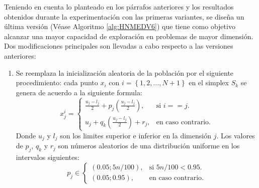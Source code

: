 Teniendo en cuenta lo planteado en los párrafos anteriores y los resultados obtenidos durante la experimentación con las primeras variantes, se diseña un última versión (Véase Algoritmo \ref{alg:HNMEDV6}) que tiene como objetivo alcanzar una mayor capacidad de exploración en problemas de mayor dimensión. Dos modificaciones principales son llevadas a cabo respecto a las versiones anteriores:
\begin{enumerate}
	\item Se reemplaza la inicialización aleatoria de la población por el siguiente procedimiento: cada punto $x_i$ con $i =\left\lbrace  1,2,...,N+1\right\rbrace $ en  el simplex $S_k$ se genera de acuerdo a la siguiente formula:
	\begin{equation}\label{eq:Inicializacion de Simpleces}
	x^i_j=\begin{cases}
	\frac{u_j-l_j}{2}+p_j(\frac{u_j-l_j}{2}), & \text{si $i==j$}.\\
	u_j+q_k(\frac{u_j-l_j}{2})+r_j, & \text{en caso contrario}.
	\end{cases}
	\end{equation}
	Donde $u_j$ y $l_j$ son los limites superior e inferior en la dimensión $j$. Los valores de  $p_j$, $q_k$ y $r_j$ son números aleatorios de una distribución uniforme en los intervalos siguientes:
	\begin{equation}
	p_j \in \begin{cases}
	(0.05;5n/100), & \text{si $5n/100 <0.95$}.\\
	(0.05;0.95), & \text{en caso contrario}.
	\end{cases}
	\end{equation}
	

\end{enumerate}
